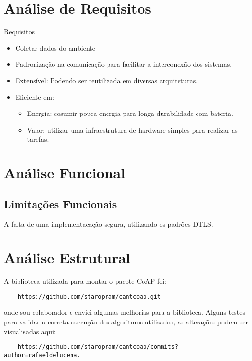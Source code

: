 \section{An\'alise de Requisitos}
Requisitos
\begin{itemize}
    \item Coletar dados do ambiente
    \item Padroniza\c{c}\~ao na comunica\c{c}\~ao para facilitar a interconex\~ao dos sistemas.
    \item Extens\'ivel: Podendo ser reutilizada em diversas arquiteturas.
    \item Eficiente em:
        \begin{itemize}
            \item Energia: cosumir pouca energia para longa durabilidade com bateria.
            \item Valor: utilizar uma infraestrutura de hardware simples para realizar as tarefas.
        \end{itemize}
\end{itemize}
\section{An\'alise Funcional}
\subsection{Limita\c{c}\~oes Funcionais}
A falta de uma implementaca\c{c}\~ao segura, utilizando os padr\~oes DTLS.
\section{An\'alise Estrutural}
A biblioteca utilizada para montar o pacote CoAP foi:
\begin{lstlisting}
    https://github.com/staropram/cantcoap.git
\end{lstlisting} onde sou colaborador e enviei algumas melhorias para a biblioteca.
Alguns testes para validar a correta execu\c{c}\~ao dos algoritmos utilizados, as altera\c{c}\~oes podem ser visualisadas aqui:
\begin{lstlisting}
    https://github.com/staropram/cantcoap/commits?author=rafaeldelucena.
\end{lstlisting}


